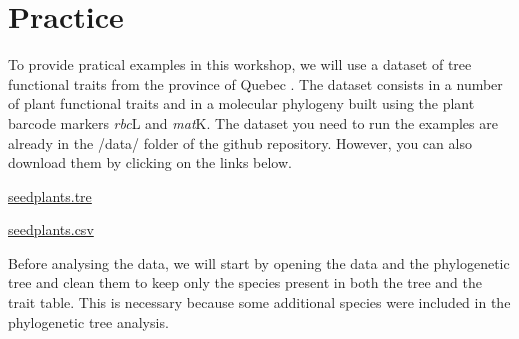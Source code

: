 \documentclass[
]{book}
\newenvironment{Shaded}{\begin{snugshade}}{\end{snugshade}}
\newcommand{\CommentTok}[1]{\textcolor[rgb]{0.56,0.35,0.01}{\textit{#1}}}
\newcommand{\FunctionTok}[1]{\textcolor[rgb]{0.00,0.00,0.00}{#1}}
\newcommand{\NormalTok}[1]{#1}
\newcommand{\OtherTok}[1]{\textcolor[rgb]{0.56,0.35,0.01}{#1}}
\newcommand{\SpecialCharTok}[1]{\textcolor[rgb]{0.00,0.00,0.00}{#1}}
\newcommand{\StringTok}[1]{\textcolor[rgb]{0.31,0.60,0.02}{#1}}
\begin{document}
\hypertarget{practice}{%
\section{Practice}\label{practice}}

To provide pratical examples in this workshop, we will use a dataset of tree functional traits from the province of Quebec \citep{paquette2015explaining}. The dataset consists in a number of plant functional traits and in a molecular phylogeny built using the plant barcode markers \emph{rbc}L and \emph{mat}K. The dataset you need to run the examples are already in the /data/ folder of the github repository. However, you can also download them by clicking on the links below.

\href{https://simjoly.github.io/ComparativeMethods-HalfDayWorkshop/data/seedplants.tre}{seedplants.tre}

\href{https://simjoly.github.io/ComparativeMethods-HalfDayWorkshop/data/seedplants.csv}{seedplants.csv}

Before analysing the data, we will start by opening the data and the phylogenetic tree and clean them to keep only the species present in both the tree and the trait table. This is necessary because some additional species were included in the phylogenetic tree analysis.

\begin{Shaded}
\end{Shaded}
\end{document}
